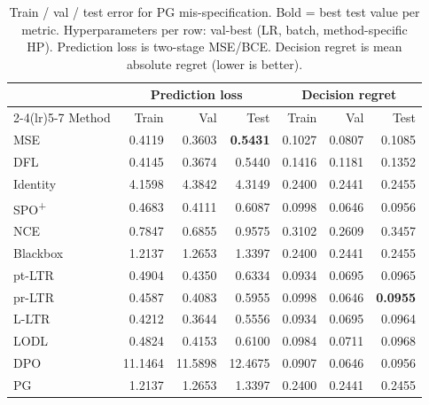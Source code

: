 \begin{table}[h]
\centering
\caption[Train/val/test error for PG mis-specification.]{Train / val / test error for PG mis-specification. Bold = best test value per metric. Hyperparameters per row: val-best (LR, batch, method-specific HP). Prediction loss is two-stage MSE/BCE. Decision regret is mean absolute regret (lower is better).}
\label{tab:err-pg-misspec}
\setlength{\tabcolsep}{4pt}
\renewcommand{\arraystretch}{1.05}
\begin{tabular}{@{}lrrrrrr@{}}
\toprule
& \multicolumn{3}{c}{Prediction loss} & \multicolumn{3}{c}{Decision regret} \\
\cmidrule(lr){2-4}\cmidrule(lr){5-7}
Method & Train & Val & Test & Train & Val & Test \\
\midrule
MSE & 0.4119 & 0.3603 & \textbf{0.5431} & 0.1027 & 0.0807 & 0.1085 \\
DFL & 0.4145 & 0.3674 & 0.5440 & 0.1416 & 0.1181 & 0.1352 \\
Identity & 4.1598 & 4.3842 & 4.3149 & 0.2400 & 0.2441 & 0.2455 \\
SPO\textsuperscript{+} & 0.4683 & 0.4111 & 0.6087 & 0.0998 & 0.0646 & 0.0956 \\
NCE & 0.7847 & 0.6855 & 0.9575 & 0.3102 & 0.2609 & 0.3457 \\
Blackbox & 1.2137 & 1.2653 & 1.3397 & 0.2400 & 0.2441 & 0.2455 \\
pt-LTR & 0.4904 & 0.4350 & 0.6334 & 0.0934 & 0.0695 & 0.0965 \\
pr-LTR & 0.4587 & 0.4083 & 0.5955 & 0.0998 & 0.0646 & \textbf{0.0955} \\
L-LTR & 0.4212 & 0.3644 & 0.5556 & 0.0934 & 0.0695 & 0.0964 \\
LODL & 0.4824 & 0.4153 & 0.6100 & 0.0984 & 0.0711 & 0.0968 \\
DPO & 11.1464 & 11.5898 & 12.4675 & 0.0907 & 0.0646 & 0.0956 \\
PG & 1.2137 & 1.2653 & 1.3397 & 0.2400 & 0.2441 & 0.2455 \\
\bottomrule
\end{tabular}
\end{table}

